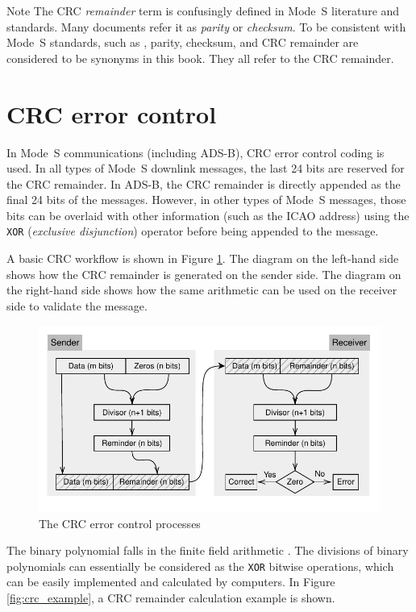\begin{notebox}{Note}
The CRC \emph{remainder} term is confusingly defined in Mode~S literature and standards. Many documents refer it as \emph{parity} or \emph{checksum}. To be consistent with Mode~S standards, such as \cite{icao9871v1, rtca2011mops}, parity, checksum, and CRC remainder are considered to be synonyms in this book. They all refer to the CRC remainder.
\end{notebox}

\section{CRC error control}

In Mode~S communications (including ADS-B), CRC error control coding is used. In all types of Mode~S downlink messages, the last 24 bits are reserved for the CRC remainder. In ADS-B, the CRC remainder is directly appended as the final 24 bits of the messages. However, in other types of Mode~S messages, those bits can be overlaid with other information (such as the ICAO address) using the \texttt{XOR} (\emph{exclusive disjunction}) operator before being appended to the message.

A basic CRC workflow is shown in Figure \ref{fig:crc_flow}. The diagram on the left-hand side shows how the CRC remainder is generated on the sender side. The diagram on the right-hand side shows how the same arithmetic can be used on the receiver side to validate the message.

\begin{figure}[ht]
  \includegraphics[scale=0.9]{figures/crc/crc_flow.pdf}
  \caption{The CRC error control processes}
  \label{fig:crc_flow}
\end{figure}


The binary polynomial falls in the finite field arithmetic \cite{carlitz1932}. The divisions of binary polynomials can essentially be considered as the \texttt{XOR} bitwise operations, which can be easily implemented and calculated by computers. In Figure \ref{fig:crc_example}, a CRC remainder calculation example is shown.



